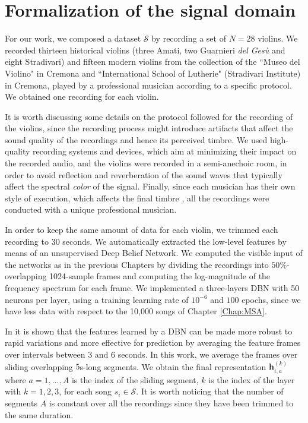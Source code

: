 \section{Formalization of the signal domain}\label{sec:Violin:features}
For our work, we composed a dataset $\mathcal{S}$ by recording a set of $N=28$ violins. We recorded thirteen historical violins (three Amati, two Guarnieri {\em del Ges\`u} and eight Stradivari) and fifteen modern violins from the collection of the ``Museo del Violino" in Cremona and ``International School of Lutherie" (Stradivari Institute) in Cremona, played by a professional musician according to a specific protocol. We obtained one recording for each violin.

It is worth discussing some details on the protocol followed for the recording of the violins, since the recording process might introduce artifacts that affect the sound quality of the recordings and hence its perceived timbre. We used high-quality recording systems and devices, which aim at minimizing their impact on the recorded audio, and the violins were recorded in a semi-anechoic room, in order to avoid reflection and reverberation of the sound waves that typically affect the spectral \textit{color} of the signal. Finally, since each musician has their own style of execution, which affects the final timbre \cite{percival2013physical}, all the recordings were conducted with a unique professional musician. 

In order to keep the same amount of data for each violin, we trimmed each recording to 30 seconds. We automatically extracted the low-level features by means of an unsupervised Deep Belief Network. We computed the visible input of the networks as in the previous Chapters by dividing the recordings into $50\%$-overlapping 1024-sample frames and computing the log-magnitude of the frequency spectrum for each frame. We implemented a three-layers DBN with 50 neurons per layer, using a training learning rate of $10^{-6}$ and $100$ epochs, since we have less data with respect to the 10,000 songs of Chapter \ref{Chap:MSA}. 

In \cite{hamel2011} it is shown that the features learned by a DBN can be made more robust to rapid variations and more effective for prediction by averaging the feature frames over intervals between 3 and 6 seconds. In this work, we average the frames over sliding overlapping $5$s-long segments. We obtain the final representation $\mathbf{h}^{(k)}_{i,a}$ where $a=1,..., A$ is the index of the sliding segment, $k$ is the index of the layer with $k=1,2,3$, for each song $s_i \in \mathcal{S}$. It is worth noticing that the number of segments $A$ is constant over all the recordings since they have been trimmed to the same duration.


